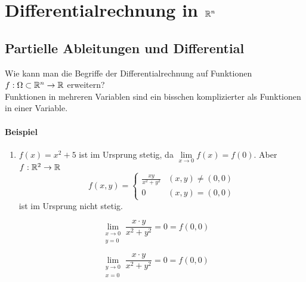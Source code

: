 \chapter{Differentialrechnung in $\R^{\lowercase{n}}$}
\section{Partielle Ableitungen und Differential}
Wie kann man die Begriffe der  Differentialrechnung auf Funktionen $f:\Omega \subset \mathbb{R}^n\to\mathbb{R}$ erweitern?\\

Funktionen in mehreren Variablen sind ein bisschen komplizierter als Funktionen in einer Variable.
\subsubsection*{Beispiel}
\begin{enumerate}
\item $f(x)=x^2+5$ ist im Ursprung stetig, da $\lim\limits_{x\to 0}f(x)=f(0)$. Aber $f:\mathbb{R}^2\to\mathbb{R}$ \[f(x,y) = \left\{ {\begin{array}{*{20}{c}}
{\frac{{xy}}{{{x^2} + {y^2}}}}&{(x,y)\not  = (0,0)}\\
0&{(x,y) = (0,0)}
\end{array}} \right.\] ist im Ursprung nicht stetig. %
\end{enumerate}
\begin{figure}[ht]
\begin{minipage}[b]{0.45\linewidth}
\centering
\[\mathop {\lim }\limits_{\begin{array}{*{20}{c}}
{x \to 0}\\
{y = 0}
\end{array}} \frac{{x \cdot y}}{{{x^2} + {y^2}}} = 0 = f(0,0)\]
\end{minipage}
\hspace{0.5cm}
\begin{minipage}[b]{0.45\linewidth}
\centering
\[\mathop {\lim }\limits_{\begin{array}{*{20}{c}}
{y \to 0}\\
{x = 0}
\end{array}} \frac{{x \cdot y}}{{{x^2} + {y^2}}} = 0 = f(0,0)\]
\end{minipage}
\end{figure}


